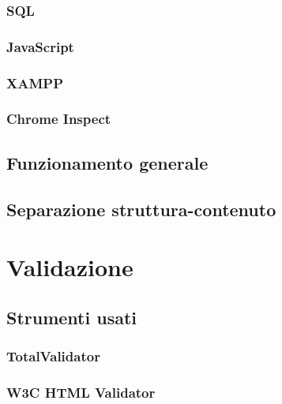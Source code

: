 \documentclass[a4paper]{article}
\begin{document}
			\subsubsection{SQL}
				
			\subsubsection{JavaScript}
				
			\subsubsection{XAMPP}
				
			\subsubsection{Chrome Inspect}
				
		\subsection{Funzionamento generale}
			
		\subsection{Separazione struttura-contenuto}
			
		
	\newpage

	\section{Validazione}
		\subsection{Strumenti usati}
			
			\subsubsection{TotalValidator}
				
			\subsubsection{W3C HTML Validator}
				
\end{document}
